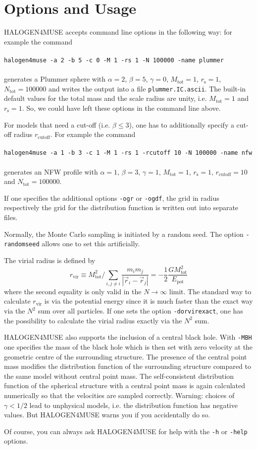 \documentclass[a4paper,10pt]{article}
\newcommand{\rvir}{r_{\mathrm{vir}}}
\newcommand{\rs}{r_{\mathrm{s}}}
\newcommand{\rcut}{r_{\mathrm{cutoff}}}
\newcommand{\Mtot}{M_{\mathrm{tot}}}
\newcommand{\Ntot}{N_{\mathrm{tot}}}
\begin{document}
\section{Options and Usage}

HALOGEN4MUSE accepts command line options in the following way: for example the command \\ 
\\
\texttt{halogen4muse -a 2 -b 5 -c 0 -M 1 -rs 1 -N 100000 -name plummer} \\ 
\\
generates a Plummer sphere with $\alpha = 2$, $\beta = 5$, $\gamma = 0$, $\Mtot = 1$, $\rs = 1$, $\Ntot = 100000$ and writes the output into a file \texttt{plummer.IC.ascii}. The built-in default values for the total mass and the scale radius are unity, i.e. $\Mtot = 1$ and $\rs = 1$. So, we could have left these options in the command line above.

For models that need a cut-off (i.e. $\beta \leq 3$), one has to additionally specify a cut-off radius $\rcut$. For example the command \\
\\
\texttt{halogen4muse -a 1 -b 3 -c 1 -M 1 -rs 1 -rcutoff 10 -N 100000 -name nfw}\\ 
\\
generates an NFW profile with $\alpha = 1$, $\beta = 3$, $\gamma = 1$, $\Mtot = 1$, $\rs = 1$, $\rcut = 10$ and $\Ntot = 100000$.

If one specifies the additional options \texttt{-ogr} or \texttt{-ogdf}, the grid in radius respectively the grid for the distribution function is written out into separate files.

Normally, the Monte Carlo sampling is initiated by a random seed. The option \texttt{-randomseed} allows one to set this artificially.

The virial radius is defined by
\begin{equation}
\rvir \equiv {\Mtot^2}/{\sum_{i, j \neq i} \frac{m_i m_j}{|\vec{r}_i - \vec{r}_j|}} = - \frac{1}{2} \frac{G \Mtot^2}{E_{\mathrm{pot}}}
\end{equation}
where the second equality is only valid in the $N \rightarrow \infty$ limit. The standard way to calculate $\rvir$ is via the potential energy since it is much faster than the exact way via the $N^2$ sum over all particles. If one sets the option \texttt{-dorvirexact}, one has the possibility to calculate the virial radius exactly via the $N^2$ sum.

HALOGEN4MUSE also supports the inclusion of a central black hole. With \texttt{-MBH} one specifies the mass of the black hole which is then set with zero velocity at the geometric centre of the surrounding structure. The presence of the central point mass modifies the distribution function of the surrounding structure compared to the same model without central point mass. The self-consistent distribution function of the spherical structure with a central point mass is again calculated numerically so that the velocities are sampled correctly. Warning: choices of $\gamma < 1/2$ lead to unphysical models, i.e. the distribution function has negative values. But HALOGEN4MUSE warns you if you accidentally do so.

Of course, you can always ask HALOGEN4MUSE for help with the \texttt{-h} or \texttt{-help} options.
\end{document}
